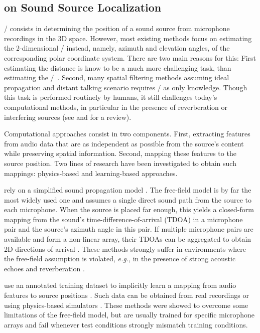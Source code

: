 \subsection{on Sound Source Localization}
\SSLdef/ consists in determining the position of a sound source from microphone recordings in the 3D space.
However, most existing methods focus on estimating the 2-dimensional \DOAdef/ instead, namely, azimuth and elevation angles, of the corresponding polar coordinate system.
There are two main reasons for this:
First estimating the distance is know to be a much more challenging task, than estimating the \DOAs/~.
Second, many spatial filtering methods assuming ideal propagation and distant talking scenario requires \DOAs/ as only knowledge.
Though this task is performed routinely by humans, it still challenges today's computational methods,
in particular in the presence of reverberation or interfering sources (see \cite{rascon2017localization} and \cite{Argentieri2015} for a review).

\mynewline
Computational approaches consist in two components.
First, extracting features from audio data that are as independent as possible from the source's content while preserving spatial information.
Second, mapping these features to the source position.
Two lines of research have been investigated to obtain such mappings: physics-based and learning-based approaches.

 rely on a simplified sound propagation model \cite{rascon2017localization,Knapp1976,DiBiase2001,Lebarbenchon2018}.
The free-field model is by far the most widely used one and assumes
a single direct sound path from the source to each microphone.
When the source is placed far enough, this yields a closed-form mapping from the
sound's time-difference-of-arrival (TDOA) in a microphone pair and the source's azimuth angle in this pair.
If multiple microphone pairs are available and form a non-linear array,
their TDOAs can be aggregated to obtain 2D directions of arrival \cite{DiBiase2001}.
These methods strongly suffer in environments where the free-field assumption is violated,
\textit{e.g.}, in the presence of strong acoustic echoes and reverberation \cite{Scheuing2006}.

 use an annotated training dataset to implicitly
learn a mapping from audio features to source positions
\cite{deleforge2015acoustic, Vesperini2016, Adavanne2017,  Perotin2018, gaultier2017vast}.
Such data can be obtained from real recordings \cite{deleforge2015acoustic} or
using physics-based simulators \cite{Vesperini2016, Adavanne2017,  Perotin2018, gaultier2017vast}.
These methods were showed to overcome some limitations of the free-field model,
but are usually trained for specific microphone arrays and fail whenever test conditions strongly mismatch training conditions.

